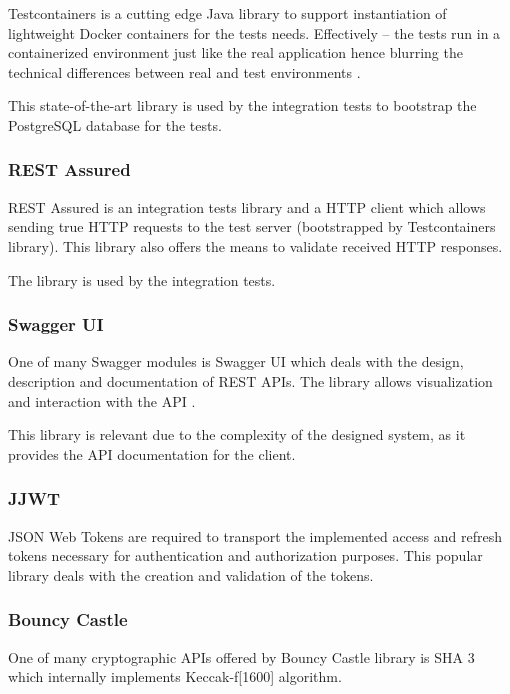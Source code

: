 \documentclass[a4paper,twoside,12pt]{book}
\begin{document}
Testcontainers is a cutting edge Java library to support instantiation of lightweight Docker containers for the tests needs. Effectively – the tests run in a containerized environment just like the real application hence blurring the technical differences between real and test environments \cite{bib:testcontainers}.

This state-of-the-art library is used by the integration tests to bootstrap the PostgreSQL database for the tests.

\subsubsection{REST Assured}

REST Assured is an integration tests library and a HTTP client which allows sending true HTTP requests to the test server (bootstrapped by Testcontainers library). This library also offers the means to validate received HTTP responses.

The library is used by the integration tests.

\subsubsection{Swagger UI}

One of many Swagger modules is Swagger UI which deals with the design, description and documentation of REST APIs. The library allows visualization and interaction with the API \cite{bib:swagger}.

This library is relevant due to the complexity of the designed system, as it provides the API documentation for the client.

\subsubsection{JJWT}

JSON Web Tokens are required to transport the implemented access and refresh tokens necessary for authentication and authorization purposes. This popular library deals with the creation and validation of the tokens.

\subsubsection{Bouncy Castle}

One of many cryptographic APIs offered by Bouncy Castle library is SHA 3 which internally implements Keccak-f[1600] algorithm.
\end{document}
